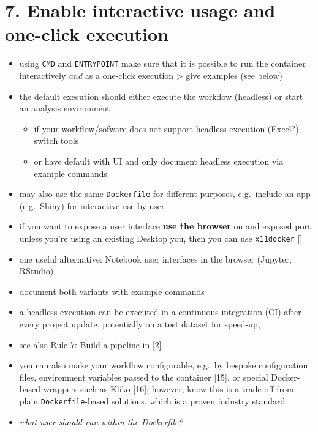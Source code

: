 \documentclass[10pt,letterpaper]{article}
\providecommand{\tightlist}{%
  \setlength{\itemsep}{0pt}\setlength{\parskip}{0pt}}
\begin{document}
\hypertarget{enable-interactive-usage-and-one-click-execution}{%
\section*{7. Enable interactive usage and one-click
execution}\label{enable-interactive-usage-and-one-click-execution}}

\begin{itemize}
\tightlist
\item
  using \texttt{CMD} and \texttt{ENTRYPOINT} make sure that it is
  possible to run the container interactively \emph{and} as a one-click
  execution \textgreater{} give examples (see below)
\item
  the default execution should either execute the workflow (headless) or
  start an analysis environment

  \begin{itemize}
  \tightlist
  \item
    if your workflow/sofware does not support headless execution
    (Excel?), switch tools
  \item
    or have default with UI and only document headless execution via
    example commands
  \end{itemize}
\item
  may also use the same \texttt{Dockerfile} for different purposes,
  e.g.~include an app (e.g.~Shiny) for interactive use by user
\item
  if you want to expose a user interface \textbf{use the browser} on and
  exposed port, unless you're using an existing Desktop you, then you
  can use \texttt{x11docker} {[}{]}
\item
  one useful alternative: Notebook user interfaces in the browser
  (Jupyter, RStudio)
\item
  document both variants with example commands
\item
  a headless execution can be executed in a continuous integration (CI)
  after every project update, potentially on a test dataset for
  speed-up,
\item
  see also Rule 7: Build a pipeline in {[}2{]}
\item
  you can also make your workflow configurable, e.g.~by bespoke
  configuration files, environment variables passed to the container
  {[}15{]}, or special Docker-based wrappers such as Kliko {[}16{]};
  however, know this is a trade-off from plain \texttt{Dockerfile}-based
  solutions, which is a proven industry standard
\item
  \emph{what user should run within the Dockerfile?}
\end{itemize}
\end{document}
